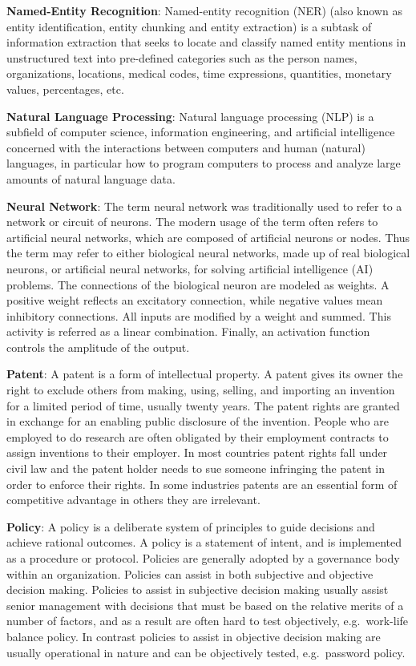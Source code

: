 \documentclass[b5paper,]{book}
\theoremstyle{definition}
\theoremstyle{definition}
\theoremstyle{definition}
\theoremstyle{remark}
\begin{document}
\textbf{Named-Entity Recognition}: Named-entity recognition (NER) (also
known as entity identification, entity chunking and entity extraction)
is a subtask of information extraction that seeks to locate and classify
named entity mentions in unstructured text into pre-defined categories
such as the person names, organizations, locations, medical codes, time
expressions, quantities, monetary values, percentages, etc.

\textbf{Natural Language Processing}: Natural language processing (NLP)
is a subfield of computer science, information engineering, and
artificial intelligence concerned with the interactions between
computers and human (natural) languages, in particular how to program
computers to process and analyze large amounts of natural language data.

\textbf{Neural Network}: The term neural network was traditionally used
to refer to a network or circuit of neurons. The modern usage of the
term often refers to artificial neural networks, which are composed of
artificial neurons or nodes. Thus the term may refer to either
biological neural networks, made up of real biological neurons, or
artificial neural networks, for solving artificial intelligence (AI)
problems. The connections of the biological neuron are modeled as
weights. A positive weight reflects an excitatory connection, while
negative values mean inhibitory connections. All inputs are modified by
a weight and summed. This activity is referred as a linear combination.
Finally, an activation function controls the amplitude of the output.

\textbf{Patent}: A patent is a form of intellectual property. A patent
gives its owner the right to exclude others from making, using, selling,
and importing an invention for a limited period of time, usually twenty
years. The patent rights are granted in exchange for an enabling public
disclosure of the invention. People who are employed to do research are
often obligated by their employment contracts to assign inventions to
their employer. In most countries patent rights fall under civil law and
the patent holder needs to sue someone infringing the patent in order to
enforce their rights. In some industries patents are an essential form
of competitive advantage in others they are irrelevant.

\textbf{Policy}: A policy is a deliberate system of principles to guide
decisions and achieve rational outcomes. A policy is a statement of
intent, and is implemented as a procedure or protocol. Policies are
generally adopted by a governance body within an organization. Policies
can assist in both subjective and objective decision making. Policies to
assist in subjective decision making usually assist senior management
with decisions that must be based on the relative merits of a number of
factors, and as a result are often hard to test objectively,
e.g.~work-life balance policy. In contrast policies to assist in
objective decision making are usually operational in nature and can be
objectively tested, e.g.~password policy.
\end{document}
